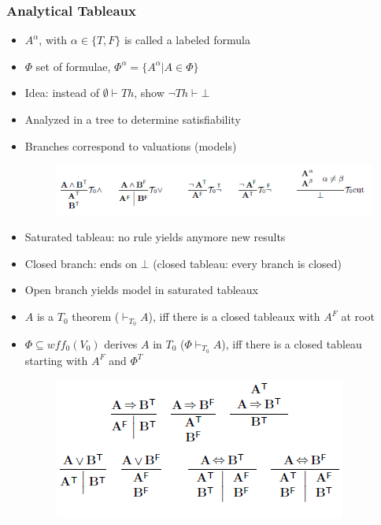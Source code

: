 \documentclass{scrartcl}
\begin{document}
\subsubsection{Analytical Tableaux}
\begin{itemize}
    \item
        $A^{\alpha}$, with $\alpha \in \{T, F\}$ is called a labeled formula
    \item
        $\Phi$ set of formulae, $\Phi^{\alpha} = \{A^{\alpha} | A \in \Phi\}$
    \item
        Idea: instead of $\emptyset \vdash Th$, show $\lnot Th \vdash \bot$
    \item
        Analyzed in a tree to determine satisfiability
    \item
        Branches correspond to valuations (models)
        \begin{figure}[H]
            \centering
            \includegraphics[scale=0.8]{figures/302}
        \end{figure}
    \item
        Saturated tableau: no rule yields anymore new results
    \item
        Closed branch: ends on $\bot$ (closed tableau: every branch is closed)
    \item
        Open branch yields model in saturated tableaux
    \item
        $A$ is a $T_0$ theorem ($\vdash_{T_0} A$), iff there is a closed tableaux with $A^F$ at root
    \item
        $\Phi \subseteq wff_0(V_0)$ derives $A$ in $T_0$ ($\Phi \vdash_{T_0} A$), iff there is a closed tableau starting with $A^F$ and $\Phi^T$
\begin{figure}[H]
            \centering
            \includegraphics[scale=0.8]{figures/308}
\end{figure} 
\end{itemize}
\end{document}
